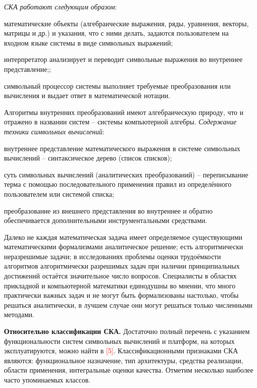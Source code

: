 \textit{СКА работают следующим образом}:
\begin{textitemize}
	\item математические объекты (алгебраические выражения, ряды, уравнения, векторы, матрицы и др.) и указания, что с ними делать, задаются пользователем на входном языке системы в виде символьных выражений;
	\item интерпретатор анализирует и переводит символьные выражения во внутреннее представление;;
	\item символьный процессор системы выполняет требуемые преобразования или вычисления и выдает ответ в математической нотации.
\end{textitemize}
Алгоритмы внутренних преобразований имеют алгебраическую природу, что и отражено в названии систем -- системы компьютерной алгебры.
\textit{Содержание техники символьных вычислений}:
\begin{textitemize}
	\item внутреннее представление математического выражения в системе символьных вычислений -- синтаксическое дерево (список списков);
	\item суть символьных вычислений (аналитических преобразований) -- переписывание терма с помощью последовательного применения правил из определённого пользователем или системой списка;
	\item преобразование из внешнего представления во внутреннее и обратно обеспечивается дополнительными инструментальными средствами.
\end{textitemize}

Далеко не каждая математическая задача имеет определяемое существующими математическими формализмами аналитическое решение; есть алгоритмически неразрешимые задачи; в исследованиях проблемы оценки трудоёмкости алгоритмов алгоритмически разрешимых задач при наличии принципиальных достижений остаётся значительное число вопросов. Специалисты в областях прикладной и компьютерной математики единодушны во мнении, что много практически важных задач и не могут быть формализованы настолько, чтобы решаться аналитически, в лучшем случае они могут решаться только численными методами.

\textbf{Относительно классификации СКА.} 
Достаточно полный перечень с указанием функциональности систем символьных вычислений и платформ, на которых эксплуатируются, можно найти в \textcolor{red}{[5]}. Классификационными признаками СКА являются: функциональное назначение, тип архитектуры, средства реализации, области применения, интегральные оценки качества. Отметим несколько наиболее часто упоминаемых классов.

